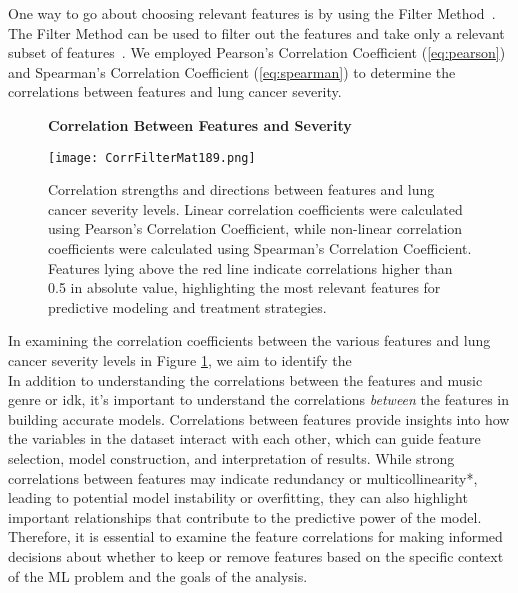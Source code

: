 \documentclass{article}
\begin{document}
One way to go about choosing relevant features is by using the Filter Method~\cite{HeavyAI}. The Filter Method can be used to filter out the features and take only a relevant subset of features~\cite{HeavyAI}. We employed Pearson's Correlation Coefficient (\ref{eq:pearson}) and Spearman's Correlation Coefficient (\ref{eq:spearman}) to determine the correlations between features and lung cancer severity.\\
\begin{figure}[H]
    \centering
    \textbf{Correlation Between Features and Severity}
    \begin{minipage}{0.7\textwidth}
        \texttt{[image: CorrFilterMat189.png]}
        \caption{Correlation strengths and directions between features and lung cancer severity levels. Linear correlation coefficients were calculated using Pearson's Correlation Coefficient, while non-linear correlation coefficients were calculated using Spearman's Correlation Coefficient. Features lying above the red line indicate correlations higher than 0.5 in absolute value, highlighting the most relevant features for predictive modeling and treatment strategies.}
        \label{table:rel_feats}
    \end{minipage}%
\end{figure}

In examining the correlation coefficients between the various features and lung cancer severity levels in Figure \ref{table:rel_feats}, we aim to identify the \\

In addition to understanding the correlations between the features and music genre or idk, it's important to understand the correlations \textit{between} the features in building accurate models. Correlations between features provide insights into how the variables in the dataset interact with each other, which can guide feature selection, model construction, and interpretation of results. While strong correlations between features may indicate redundancy or multicollinearity*, leading to potential model instability or overfitting, they can also highlight important relationships that contribute to the predictive power of the model. Therefore, it is essential to examine the feature correlations for making informed decisions about whether to keep or remove features based on the specific context of the ML problem and the goals of the analysis.\\
\end{document}
